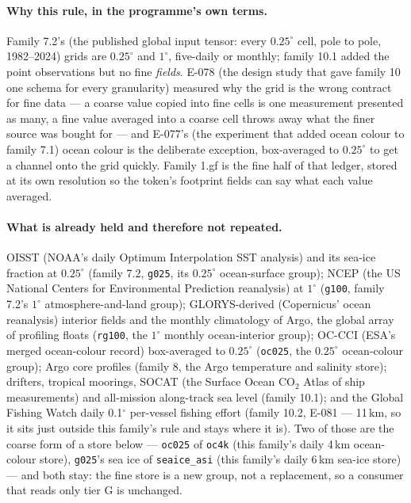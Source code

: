 \documentclass[10pt]{article}
\newcommand{\code}[1]{\texttt{#1}}
\begin{document}
\paragraph{Why this rule, in the programme's own terms.} Family 7.2's (the published global input tensor: every $0.25^\circ$ cell, pole to pole, 1982--2024) grids
are $0.25^\circ$ and $1^\circ$, five-daily or monthly; family 10.1 added the point
observations but no fine \emph{fields}. E-078 (the design study that gave family 10 one schema for every granularity) measured why the grid is the wrong
contract for fine data --- a coarse value copied into fine cells is one
measurement presented as many, a fine value averaged into a coarse cell throws
away what the finer source was bought for --- and E-077's (the experiment that added ocean colour to family 7.1) ocean colour is the
deliberate exception, box-averaged to $0.25^\circ$ to get a channel onto the
grid quickly. Family 1.gf is the fine half of that ledger, stored at its own
resolution so the token's footprint fields can say what each value averaged.

\paragraph{What is already held and therefore not repeated.} OISST (NOAA's daily Optimum Interpolation SST analysis) and its
sea-ice fraction at $0.25^\circ$ (family 7.2, \code{g025}, its $0.25^\circ$ ocean-surface group); NCEP (the US National Centers for Environmental Prediction reanalysis) at $1^\circ$
(\code{g100}, family 7.2's $1^\circ$ atmosphere-and-land group); GLORYS-derived (Copernicus' ocean reanalysis) interior fields and the monthly climatology of Argo, the global array of profiling floats
(\code{rg100}, the $1^\circ$ monthly ocean-interior group); OC-CCI (ESA's merged ocean-colour record) box-averaged to $0.25^\circ$ (\code{oc025}, the $0.25^\circ$ ocean-colour group); Argo core
profiles (family 8, the Argo temperature and salinity store); drifters, tropical moorings, SOCAT (the Surface Ocean CO$_2$ Atlas of ship measurements) and all-mission
along-track sea level (family 10.1); and the Global Fishing Watch daily
0.1$^\circ$ per-vessel fishing effort (family 10.2, E-081 --- 11\,km, so it
sits just outside this family's rule and stays where it is). Two of those are the coarse form of a
store below --- \code{oc025} of \code{oc4k} (this family's daily 4\,km ocean-colour store), \code{g025}'s sea ice of
\code{seaice\_asi} (this family's daily 6\,km sea-ice store) --- and both stay: the fine store is a new group, not a
replacement, so a consumer that reads only tier G is unchanged.
\end{document}
